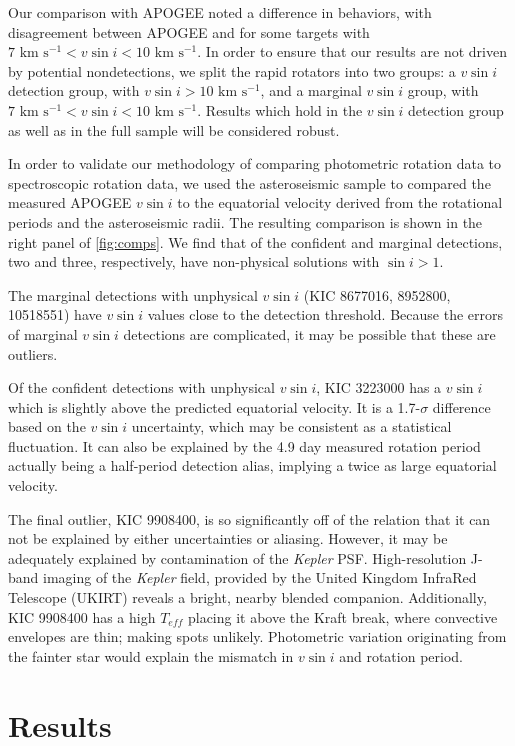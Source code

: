 \documentclass[manuscript]{aastex6}
\newcommand{\vsini}{\ensuremath{v \sin i}}
\newcommand{\Kepler}{\mbox{\textit{Kepler}}}
\newcommand{\Teff}{\ensuremath{T_{eff}}}
\newcommand{\kms}{\textrm{~km~s}\ensuremath{^{-1}}}
\begin{document}
Our comparison with APOGEE noted a difference in behaviors, with
disagreement between APOGEE and \citet{Stauffer87} for some
targets with \(7 \kms < \vsini < 10 \kms\). In order to ensure that our 
results are not driven by potential nondetections, we split the rapid
rotators into two groups: a \vsini{} detection group, with \(\vsini > 10
\kms\), and a marginal \vsini{} group, with \(7 \kms < \vsini < 10
\kms\). Results which hold in the \vsini{} detection group as well as in
the full sample will be considered robust.

In order to validate our methodology of comparing photometric rotation
data to spectroscopic rotation data, we used the asteroseismic sample to
compared the measured APOGEE \vsini{} to the equatorial velocity 
derived from the rotational periods and the asteroseismic radii. The resulting 
comparison is shown in the right panel of \cref{fig:comps}. We find that
of the confident and marginal detections, two and three, respectively, have 
non-physical solutions with \(\sin i > 1\). 

The marginal detections with unphysical \vsini{} (KIC 8677016, 8952800, 10518551) 
have \vsini{} values close to the detection threshold. Because the errors of 
marginal \vsini{} detections are complicated, it may be possible that these 
are outliers. 

Of the confident detections with unphysical \vsini{}, KIC 3223000 has a
\vsini{} which is slightly above the predicted equatorial velocity. It
is a 1.7-\(\sigma\) difference based on the \vsini{} uncertainty, which
may be consistent as a statistical fluctuation. It can also
be explained by the 4.9 day measured rotation period actually being a 
half-period detection alias, implying a twice as large equatorial velocity. 

The final outlier, KIC 9908400, is so significantly off of the relation
that it can not be explained by either uncertainties or aliasing. However,
it may be adequately explained by contamination of the \Kepler{} PSF\@. 
High-resolution J-band imaging of the \Kepler{} field, provided by the United
Kingdom InfraRed Telescope (UKIRT) reveals a bright, nearby blended companion.
Additionally, KIC 9908400 has a high \Teff{} placing it above the Kraft
break, where convective envelopes are thin;
making spots unlikely. Photometric variation originating from the fainter 
star would explain the mismatch in \vsini{} and rotation period.

\section{Results}
\label{sec:results}
\end{document}
